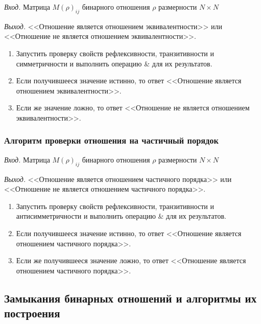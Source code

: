 \documentclass[bachelor, och, labwork]{shiza}
\begin{document}
\textit{Вход.} Матрица $M(\rho)_{ij}$ бинарного отношения $\rho$ размерности
$N \times N$

\textit{Выход.} <<Отношение является отношением эквивалентности>> или 
<<Отношение не является отношением эквивалентности>>.

\begin{enumerate}

    \item Запустить проверку свойств рефлексивности, транзитивности и симметричности
    и выполнить операцию \& для их результатов.

    \item Если получившееся значение истинно, то ответ <<Отношение является
    отношением эквивалентности>>.

    \item Если же значение ложно, то ответ <<Отношение не является отношением
    эквивалентности>>. 

\end{enumerate}


\subsubsection{Алгоритм проверки отношения на частичный порядок}

\textit{Вход.} Матрица $M(\rho)_{ij}$ бинарного отношения $\rho$ размерности
$N \times N$

\textit{Выход.} <<Отношение является
отношением частичного порядка>> или <<Отношение не является отношением 
частичного порядка>>.

\begin{enumerate}
    
    \item Запустить проверку свойств рефлексивности, транзитивности и 
    антисимметричности и выполнить операцию \& для их результатов.
    
    \item Если получившееся значение истинно, то ответ <<Отношение является
    отношением частичного порядка>>.
    
    \item Если же получившееся значение ложно, то ответ <<Отношение является
    отношением частичного порядка>>.

\end{enumerate}


\subsection{Замыкания бинарных отношений и алгоритмы их построения}
\end{document}
